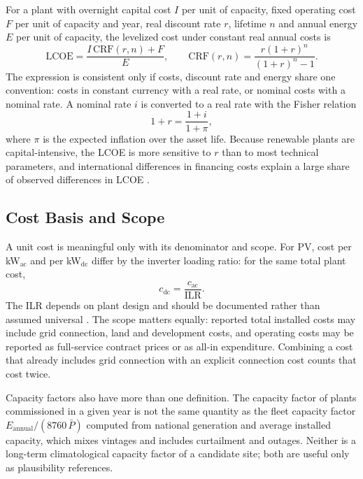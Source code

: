 For a plant with overnight capital cost $I$ per unit of capacity, fixed
operating cost $F$ per unit of capacity and year, real discount rate $r$,
lifetime $n$ and annual energy $E$ per unit of capacity, the levelized
cost under constant real annual costs is
\begin{equation}
    \mathrm{LCOE} = \frac{I\,\mathrm{CRF}(r,n) + F}{E},
    \qquad
    \mathrm{CRF}(r,n) = \frac{r(1+r)^n}{(1+r)^n-1}.
    \label{eq:theory_lcoe}
\end{equation}
The expression is consistent only if costs, discount rate and energy
share one convention: costs in constant currency with a real rate, or
nominal costs with a nominal rate. A nominal rate $i$ is converted to a
real rate with the Fisher relation
\begin{equation}
    1+r = \frac{1+i}{1+\pi},
    \label{eq:theory_fisher}
\end{equation}
where $\pi$ is the expected inflation over the asset life. Because
renewable plants are capital-intensive, the LCOE is more sensitive to
$r$ than to most technical parameters, and international differences in
financing costs explain a large share of observed differences in LCOE
\cite{irena2023financing}.

\subsection{Cost Basis and Scope}
\label{subsec:cost_basis}

A unit cost is meaningful only with its denominator and scope. For PV,
cost per kW$_{\mathrm{ac}}$ and per kW$_{\mathrm{dc}}$ differ by the
inverter loading ratio: for the same total plant cost,
\begin{equation}
    c_{\mathrm{dc}} = \frac{c_{\mathrm{ac}}}{\mathrm{ILR}} .
    \label{eq:theory_capex_basis}
\end{equation}
The ILR depends on plant design and should be documented rather than
assumed universal \cite{nrelATB2024PV}. The scope matters equally:
reported total installed costs may include grid connection, land and
development costs, and operating costs may be reported as full-service
contract prices or as all-in expenditure. Combining a cost that already
includes grid connection with an explicit connection cost counts that
cost twice.

Capacity factors also have more than one definition. The capacity factor
of plants commissioned in a given year is not the same quantity as the
fleet capacity factor $E_{\mathrm{annual}}/(8760\,\bar{P})$ computed
from national generation and average installed capacity, which mixes
vintages and includes curtailment and outages. Neither is a long-term
climatological capacity factor of a candidate site; both are useful only
as plausibility references.
